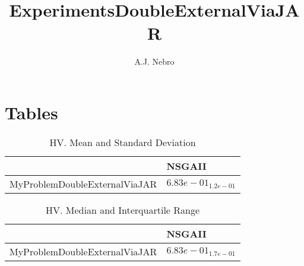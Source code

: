 \documentclass{article}
\title{ExperimentsDoubleExternalViaJAR}
\author{A.J. Nebro}
\begin{document}
\maketitle
\section{Tables}

\begin{table}
\caption{HV. Mean and Standard Deviation}
\label{table: HV}
\centering
\begin{scriptsize}
\begin{tabular}{ll}
\hline &  NSGAII\\
\hline 
MyProblemDoubleExternalViaJAR & \cellcolor{gray95}$  6.83e-01_{ 1.2e-01}$ \\
\hline
\end{tabular}
\end{scriptsize}
\end{table}

\begin{table}
\caption{HV. Median and Interquartile Range}
\label{table: HV}
\centering
\begin{scriptsize}
\begin{tabular}{ll}
\hline &  NSGAII\\
\hline 
MyProblemDoubleExternalViaJAR & \cellcolor{gray95}$  6.83e-01_{ 1.7e-01}$ \\
\hline
\end{tabular}
\end{scriptsize}
\end{table}
\end{document}

